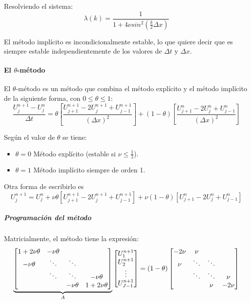 Resolviendo el sistema:
$$\lambda(k) = \frac{1}{1+4\nu sin^2\left(\frac{k}{2}\Delta x\right)}$$

El método implícito es incondicionalmente estable, lo que quiere decir que es siempre estable independientemente de los valores de $\Delta t$ y $\Delta x$.

\paragraph{El $\theta$-método}\mbox{}

El $\theta$-método es un método que combina el método explícito y el método implícito de la siguiente forma, con $0\le\theta\le 1$:
$$\frac{U_j^{n+1}-U_j^n}{\Delta t} = 
\theta \left[\frac{U_{j+1}^{n+1}-2U_{j}^{n+1}+U_{j-1}^{n+1}}{(\Delta x)^2}\right] +
(1-\theta) \left[ \frac{U_{j+1}^n-2U_j^n+U_{j-1}^n}{(\Delta x)^2}\right]$$

Según el valor de $\theta$ se tiene:
\begin{itemize}
	\vspace{-3mm}
	\item $\theta = 0$ Método explícito (estable si $\nu \le \frac{1}{2}$).
	\item $\theta = 1$ Método implícito siempre de orden 1.
\end{itemize}

Otra forma de escribirlo es
$$U_j^{n+1} = U_j^n + \nu\theta\left[U_{j+1}^{n+1} - 2U_{j}^{n+1} + U_{j-1}^{n+1}\right] + \nu(1-\theta)\left[U_{j+1}^{n}-2U_{j}^{n}+U_{j-1}^{n}\right]$$

\subparagraph{Programación del método}\mbox{}

Matricialmente, el método tiene la expresión:
\begin{equation*}
	\begin{array}{l l l}
		\underbrace{
		\begin{bmatrix}
			1+2\nu\theta & -\nu\theta &        & \\
			-\nu\theta   & \ddots     & \ddots & \\
			& \ddots     & \ddots     & -\nu\theta\\
			&            & -\nu\theta & 1+2\nu\theta\\
		\end{bmatrix}}_A
		\begin{bmatrix}
			U_1^{n+1}\\
			U_2^{n+1}\\
			\vdots\\
			U_{J-1}^{n+1}\\
		\end{bmatrix}
		=
		(1-\theta)
		\begin{bmatrix}
			-2\nu         & \nu&        & \\
			\nu            & \ddots       & \ddots & \\
			& \ddots & \ddots        & \nu\\
			&        & \nu & -2\nu\\
		\end{bmatrix}
	\end{array}
	\end{equation*}
	
